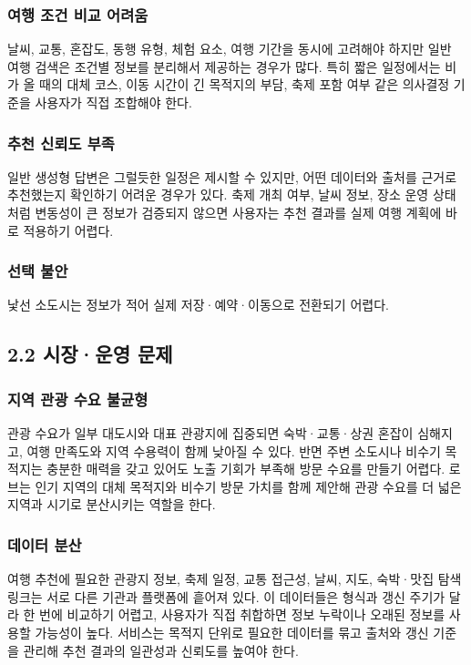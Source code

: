\documentclass[12pt,a4paper]{article}
\newcommand{\DocNeedspace}[1]{\par\ifdim\dimexpr\pagegoal-\pagetotal\relax<#1\newpage\fi}
\begin{document}
\DocNeedspace{5\baselineskip}
\subsubsection*{여행 조건 비교 어려움}
날씨, 교통, 혼잡도, 동행 유형, 체험 요소, 여행 기간을 동시에 고려해야 하지만 일반 여행 검색은 조건별 정보를 분리해서 제공하는 경우가 많다. 특히 짧은 일정에서는 비가 올 때의 대체 코스, 이동 시간이 긴 목적지의 부담, 축제 포함 여부 같은 의사결정 기준을 사용자가 직접 조합해야 한다.

\DocNeedspace{5\baselineskip}
\subsubsection*{추천 신뢰도 부족}
일반 생성형 답변은 그럴듯한 일정은 제시할 수 있지만, 어떤 데이터와 출처를 근거로 추천했는지 확인하기 어려운 경우가 있다. 축제 개최 여부, 날씨 정보, 장소 운영 상태처럼 변동성이 큰 정보가 검증되지 않으면 사용자는 추천 결과를 실제 여행 계획에 바로 적용하기 어렵다.

\DocNeedspace{5\baselineskip}
\subsubsection*{선택 불안}
낯선 소도시는 정보가 적어 실제 저장·예약·이동으로 전환되기 어렵다.


\newpage

\DocNeedspace{24\baselineskip}
\subsection*{2.2 시장·운영 문제}


\DocNeedspace{5\baselineskip}
\subsubsection*{지역 관광 수요 불균형}
관광 수요가 일부 대도시와 대표 관광지에 집중되면 숙박·교통·상권 혼잡이 심해지고, 여행 만족도와 지역 수용력이 함께 낮아질 수 있다. 반면 주변 소도시나 비수기 목적지는 충분한 매력을 갖고 있어도 노출 기회가 부족해 방문 수요를 만들기 어렵다. 로브는 인기 지역의 대체 목적지와 비수기 방문 가치를 함께 제안해 관광 수요를 더 넓은 지역과 시기로 분산시키는 역할을 한다.

\DocNeedspace{5\baselineskip}
\subsubsection*{데이터 분산}
여행 추천에 필요한 관광지 정보, 축제 일정, 교통 접근성, 날씨, 지도, 숙박·맛집 탐색 링크는 서로 다른 기관과 플랫폼에 흩어져 있다. 이 데이터들은 형식과 갱신 주기가 달라 한 번에 비교하기 어렵고, 사용자가 직접 취합하면 정보 누락이나 오래된 정보를 사용할 가능성이 높다. 서비스는 목적지 단위로 필요한 데이터를 묶고 출처와 갱신 기준을 관리해 추천 결과의 일관성과 신뢰도를 높여야 한다.
\end{document}
